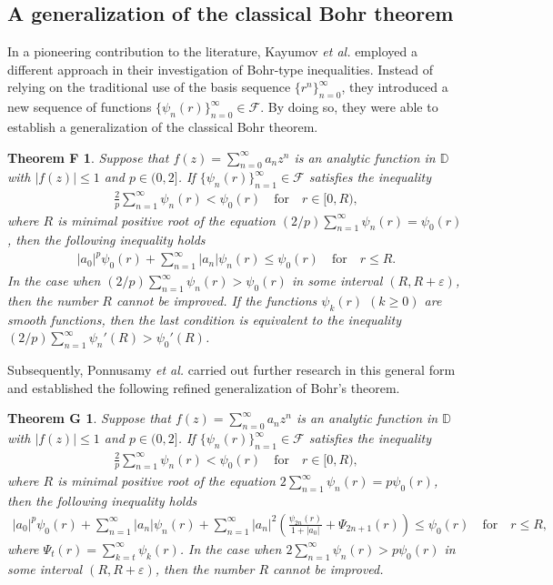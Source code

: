 \documentclass[11pt,reqno]{amsart}
\newtheorem*{theoF}{Theorem F}
\newtheorem*{theoG}{Theorem G}
\newtheorem{open problem}{Open problem}[section]
\newcommand{\F}{{\mathcal{F}}}
\newcommand{\beas}{\begin{eqnarray*}}
\newcommand{\eeas}{\end{eqnarray*}}
\renewcommand{\epsilon}{\varepsilon}
\numberwithin{equation}{section}
\begin{document}
\subsection{A generalization of the classical Bohr theorem}
In a pioneering contribution to the literature, Kayumov {\it et al.} \cite{KKP2022} employed a different approach in their investigation of Bohr-type inequalities. Instead of relying on 
the traditional use of the basis sequence $\{r^n\}_{n=0}^\infty$, they introduced a new sequence of functions $\{\psi_n(r)\}_{n=0}^\infty\in\F$. By doing so, they were able to 
establish a generalization of the classical Bohr theorem.
\begin{theoF} \cite{KKP2022} 
Suppose that $f(z)=\sum_{n=0}^\infty a_n z^n$ is an analytic function in $\mathbb{D}$ with $|f(z)|\leq 1$ and $p\in(0,2]$. If $\{\psi_n(r)\}_{n=1}^\infty\in\F$ satisfies the inequality
\beas \frac{2}{p}\sum_{n=1}^\infty \psi_n(r)<\psi_0(r)\quad\text{for}\quad r\in[0,R),\eeas
where $R$ is minimal positive root of the equation $(2/p)\sum_{n=1}^\infty \psi_n(r)=\psi_0(r)$,
then the following inequality holds 
\beas |a_0|^p\psi_0(r)+\sum_{n=1}^\infty |a_n| \psi_n(r)\leq \psi_0(r)\quad\text{for}\quad r\leq R.\eeas
In the case when $(2/p)\sum_{n=1}^\infty \psi_n(r)>\psi_0(r)$ in some interval $(R, R+\epsilon)$, then the number $R$ cannot be improved. If the functions $\psi_k(r)$ $(k\geq 0)$ are smooth functions, then the last condition is equivalent to the inequality $(2/p)\sum_{n=1}^\infty \psi_n'(R)>\psi_0'(R)$. 
\end{theoF}
Subsequently, Ponnusamy {\it et al.} \cite{PVW2021} carried out further research in this general form and established the following refined generalization of Bohr's theorem.
\begin{theoG} \cite{PVW2021} 
Suppose that $f(z)=\sum_{n=0}^\infty a_n z^n$ is an analytic function in $\mathbb{D}$ with $|f(z)|\leq 1$ and $p\in(0,2]$. If $\{\psi_n(r)\}_{n=1}^\infty\in\F$ satisfies the inequality
\beas \frac{2}{p}\sum_{n=1}^\infty \psi_n(r)<\psi_0(r)\quad\text{for}\quad r\in[0,R),\eeas
where $R$ is minimal positive root of the equation $2\sum_{n=1}^\infty \psi_n(r)=p\psi_0(r)$,
then the following inequality holds 
\beas |a_0|^p\psi_0(r)+\sum_{n=1}^\infty |a_n| \psi_n(r)+\sum_{n=1}^\infty |a_n|^2\left(\frac{\psi_{2n}(r)}{1+|a_0|}+\Psi_{2n+1}(r)\right)\leq \psi_0(r)\quad\text{for}\quad r\leq R,\eeas
where $\Psi_t(r)=\sum_{k=t}^\infty \psi_k(r)$.
In the case when $2\sum_{n=1}^\infty \psi_n(r)>p\psi_0(r)$ in some interval $(R, R+\epsilon)$, then the number $R$ cannot be improved.
\end{theoG}
\end{document}
